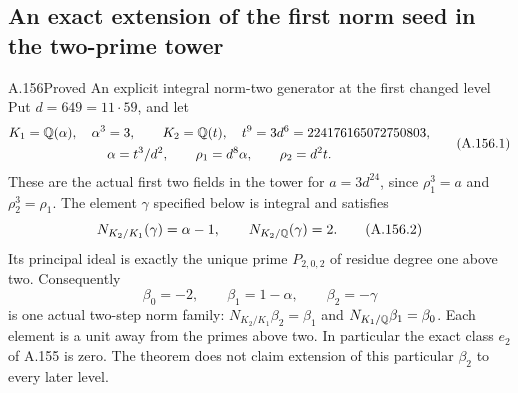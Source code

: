 \subsection{An exact extension of the first norm seed in the two-prime tower}

\begin{statement}{A.156}{Proved}
{An explicit integral norm-two generator at the first changed level}
Put \(d=649=11\cdot59\), and let
\[
 \begin{gathered}
 K_1=\mathbb Q(\alpha),\quad\alpha^3=3,\qquad
 K_2=\mathbb Q(t),\quad t^9=3d^6=224176165072750803,\\
 \alpha=t^3/d^2,\qquad
 \rho_1=d^8\alpha,\qquad\rho_2=d^2t.
 \end{gathered}
\tag{A.156.1}
\]
These are the actual first two fields in the tower for
\(a=3d^{24}\), since \(\rho_1^3=a\) and \(\rho_2^3=\rho_1\).
The element \(\gamma\) specified below is integral and satisfies
\[
                  N_{K_2/K_1}(\gamma)=\alpha-1,
                 \qquad N_{K_2/\mathbb Q}(\gamma)=2.
\tag{A.156.2}
\]
Its principal ideal is exactly the unique prime \(P_{2,0,2}\)
of residue degree one above two.
Consequently
\[
 \beta_0=-2,\qquad\beta_1=1-\alpha,\qquad\beta_2=-\gamma
\tag{A.156.3}
\]
is one actual two-step norm family:
\(N_{K_2/K_1}\beta_2=\beta_1\) and
\(N_{K_1/\mathbb Q}\beta_1=\beta_0\).
Each element is a unit away from the primes above two.
In particular the exact class \(e_2\) of A.155 is zero.
The theorem does not claim extension of this particular \(\beta_2\)
to every later level.
\end{statement}

